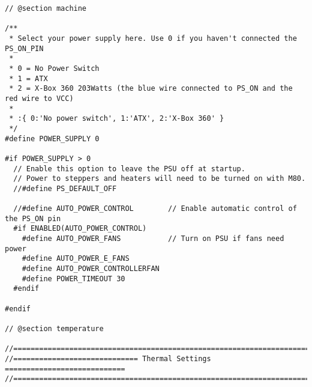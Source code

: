 \begin{lstlisting}
// @section machine

/**
 * Select your power supply here. Use 0 if you haven't connected the PS_ON_PIN
 *
 * 0 = No Power Switch
 * 1 = ATX
 * 2 = X-Box 360 203Watts (the blue wire connected to PS_ON and the red wire to VCC)
 *
 * :{ 0:'No power switch', 1:'ATX', 2:'X-Box 360' }
 */
#define POWER_SUPPLY 0

#if POWER_SUPPLY > 0
  // Enable this option to leave the PSU off at startup.
  // Power to steppers and heaters will need to be turned on with M80.
  //#define PS_DEFAULT_OFF

  //#define AUTO_POWER_CONTROL        // Enable automatic control of the PS_ON pin
  #if ENABLED(AUTO_POWER_CONTROL)
    #define AUTO_POWER_FANS           // Turn on PSU if fans need power
    #define AUTO_POWER_E_FANS
    #define AUTO_POWER_CONTROLLERFAN
    #define POWER_TIMEOUT 30
  #endif

#endif

// @section temperature

//===========================================================================
//============================= Thermal Settings ============================
//===========================================================================


\end{lstlisting}
